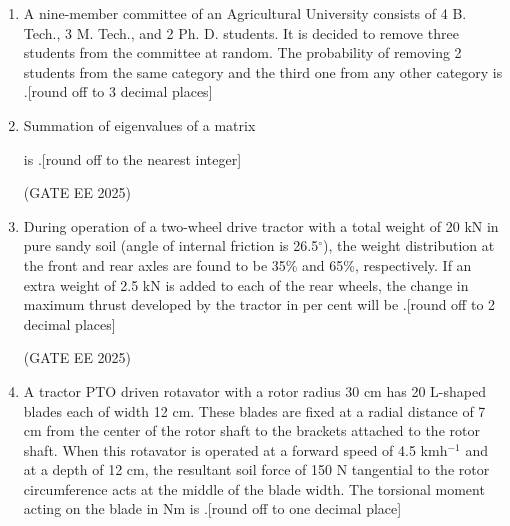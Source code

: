 \documentclass[journal,12pt,onecolumn]{IEEEtran}
\theoremstyle{remark}
\begin{document}
\begin{enumerate}
\hfill(GATE EE 2025)

\begin{multicols}{4}
\begin{enumerate}
\item 6.5
\item 7.4
\item 11.9
\item 14.8
\end{enumerate}
\end{multicols}

\item A nine-member committee of an Agricultural University consists of 4 B. Tech., 3 M. Tech., and 2 Ph. D. students. It is decided to remove three students from the committee at random. The probability of removing 2 students from the same category and the third one from any other category is \underline{\hspace{2cm}}.{[round off to 3 decimal places]}


\item Summation of eigenvalues of a matrix 

is \underline{\hspace{2cm}}.{[round off to the nearest integer]}

\hfill(GATE EE 2025)

\item During operation of a two-wheel drive tractor with a total weight of 20 kN in pure sandy soil (angle of internal friction is 26.5$^\circ$), the weight distribution at the front and rear axles are found to be 35\% and 65\%, respectively. If an extra weight of 2.5 kN is added to each of the rear wheels, the change in maximum thrust developed by the tractor in per cent will be \underline{\hspace{2cm}}.{[round off to 2 decimal places]}

\hfill(GATE EE 2025)

\item A tractor PTO driven rotavator with a rotor radius 30 cm has 20 L-shaped blades each of width 12 cm. These blades are fixed at a radial distance of 7 cm from the center of the rotor shaft to the brackets attached to the rotor shaft. When this rotavator is operated at a forward speed of 4.5 kmh$^{-1}$ and at a depth of 12 cm, the resultant soil force of 150 N tangential to the rotor circumference acts at the middle of the blade width. The torsional moment acting on the blade in Nm is \underline{\hspace{2cm}}.{[round off to one decimal place]}


\end{enumerate}
\end{document}
